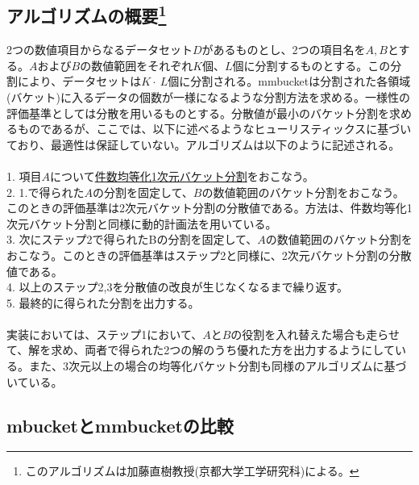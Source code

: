 \subsection*{アルゴリズムの概要\footnote{このアルゴリズムは加藤直樹教授(京都大学工学研究科)による。}}

2つの数値項目からなるデータセット$D$があるものとし、2つの項目名を$A,B$とする。$A$および$B$の数値範囲をそれぞれ$K$個、$L$個に分割するものとする。この分割により、データセットは$K\cdot~L$個に分割される。mmbucketは分割された各領域(バケット)に入るデータの個数が一様になるような分割方法を求める。一様性の評価基準としては分散を用いるものとする。分散値が最小のバケット分割を求めるものであるが、ここでは、以下に述べるようなヒューリスティックスに基づいており、最適性は保証していない。アルゴリズムは以下のように記述される。\\
\\
1. 項目$A$について\hyperref[sect:mbucket]{件数均等化1次元バケット分割}をおこなう。\\
2. 1.で得られた$A$の分割を固定して、$B$の数値範囲のバケット分割をおこなう。このときの評価基準は2次元バケット分割の分散値である。方法は、件数均等化1次元バケット分割と同様に動的計画法を用いている。\\
3. 次にステップ2で得られたBの分割を固定して、$A$の数値範囲のバケット分割をおこなう。このときの評価基準はステップ2と同様に、2次元バケット分割の分散値である。\\
4. 以上のステップ2,3を分散値の改良が生じなくなるまで繰り返す。\\
5. 最終的に得られた分割を出力する。\\
\\
実装においては、ステップ1において、$A$と$B$の役割を入れ替えた場合も走らせて、解を求め、両者で得られた2つの解のうち優れた方を出力するようにしている。また、3次元以上の場合の均等化バケット分割も同様のアルゴリズムに基づいている。

\subsection*{mbucketとmmbucketの比較}

